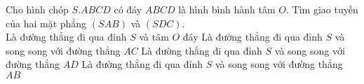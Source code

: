\begin{ex}%
        Cho hình chóp $S.ABCD$ có đáy $ABCD$ là hình bình hành tâm $O$. Tìm giao tuyến của hai mặt phẳng $\left(SAB\right)$ và $\left(SDC\right)$.\\
        \choice
        {Là đường thẳng đi qua đỉnh $S$ và tâm $O$ đáy}
        {Là đường thẳng đi qua đỉnh $S$ và song song với đường thẳng $AC$}
        {Là đường thẳng đi qua đỉnh $S$ và song song với đường thẳng $AD$}
        {\True Là đường thẳng đi qua đỉnh $S$ và song song với đường thẳng $AB$}

\end{ex}

